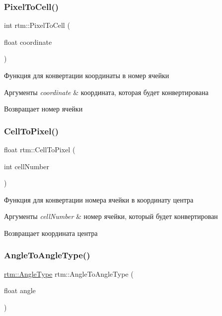 \subsubsection{\texorpdfstring{Pixel\+To\+Cell()}{PixelToCell()}}
{\footnotesize\ttfamily int rtm\+::\+Pixel\+To\+Cell (\begin{DoxyParamCaption}\item[{float}]{coordinate }\end{DoxyParamCaption})}

Функция для конвертации координаты в номер ячейки 
\begin{DoxyParams}{Аргументы}
{\em coordinate} & координата, которая будет конвертирована \\
\hline
\end{DoxyParams}
\begin{DoxyReturn}{Возвращает}
номер ячейки 
\end{DoxyReturn}
\mbox{\label{namespacertm_af8d63f917ae1055a5766a0ba19542913}} 
\subsubsection{\texorpdfstring{Cell\+To\+Pixel()}{CellToPixel()}}
{\footnotesize\ttfamily float rtm\+::\+Cell\+To\+Pixel (\begin{DoxyParamCaption}\item[{int}]{cell\+Number }\end{DoxyParamCaption})}

Функция для конвертации номера ячейки в координату центра 
\begin{DoxyParams}{Аргументы}
{\em cell\+Number} & номер ячейки, который будет конвертирован \\
\hline
\end{DoxyParams}
\begin{DoxyReturn}{Возвращает}
координата центра 
\end{DoxyReturn}
\mbox{\label{namespacertm_aea5ae6d368199e41611725e0db13c5c3}} 
\subsubsection{\texorpdfstring{Angle\+To\+Angle\+Type()}{AngleToAngleType()}}
{\footnotesize\ttfamily \hyperlink{namespacertm_a69dc82b16a0148c10962caa83d930f89}{rtm\+::\+Angle\+Type} rtm\+::\+Angle\+To\+Angle\+Type (\begin{DoxyParamCaption}\item[{float}]{angle }\end{DoxyParamCaption})}

